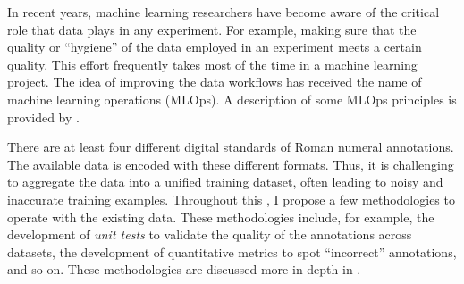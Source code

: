 

In recent years, machine learning researchers have become
aware of the critical role that data plays in any
experiment. For example, making sure that the quality or
``hygiene'' of the data employed in an experiment meets a
certain quality. This effort frequently takes most of the
time in a machine learning project. The idea of improving
the data workflows has received the name of machine learning
operations (MLOps). A description of some MLOps principles
is provided by \textcite{renggli2021data}.

There are at least four different digital standards of Roman
numeral annotations. The available data is encoded with
these different formats. Thus, it is challenging to
aggregate the data into a unified training dataset, often
leading to noisy and inaccurate training examples.
Throughout this \thesisdiss{}, I propose a few methodologies
to operate with the existing data. These methodologies
include, for example, the development of \emph{unit tests}
to validate the quality of the annotations across datasets,
the development of quantitative metrics to spot
``incorrect'' annotations, and so on. These methodologies
are discussed more in depth in .
